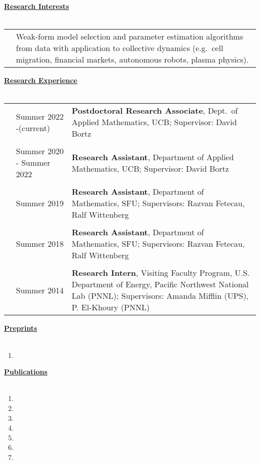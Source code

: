 \documentclass[letterpaper,11pt,oneside]{article}
\newcommand{\headr}[1]{\vspace{10pt}\uline{\Large{\textbf{#1}} \hfill } \\ \vspace{-10pt}\\}
\begin{document}
\headr{Research Interests}
%
\begin{tabular}{@{} p{0.5cm} p{15cm}}
 & Weak-form model selection and parameter estimation algorithms from data with application to collective dynamics (e.g.\ cell migration, financial markets, autonomous robots, plasma physics).
\end{tabular}

\headr{Research Experience}

\begin{tabular}{@{} p{0.01cm} p{2.5cm} p{12cm}}
& Summer 2022 -\newline (current)  & 
\textbf{Postdoctoral Research Associate}, Dept.\ of Applied Mathematics, UCB;
Supervisor: David Bortz \\
& & \\
& Summer 2020 - \newline Summer 2022  & 
\textbf{Research Assistant}, Department of Applied Mathematics, UCB; \newline
Supervisor: David Bortz \\
&     & \\
& Summer 2019  & 
\textbf{Research Assistant}, Department of Mathematics, SFU;
\newline Supervisors: Razvan Fetecau, Ralf Wittenberg \\
&     & \\
& Summer 2018  & 
\textbf{Research Assistant}, Department of Mathematics, SFU;
\newline Supervisors: Razvan Fetecau, Ralf Wittenberg \\
&     & \\
& Summer 2014  & 
\textbf{Research Intern},  Visiting Faculty Program, U.S. Department of Energy, Pacific Northwest National Lab (PNNL);
\newline Supervisors: Amanda Mifflin (UPS), P. El-Khoury (PNNL) 
\end{tabular}




\headr{Preprints}
\begin{enumerate}
\item {}
\end{enumerate}

\headr{Publications}

\begin{enumerate}
\item {}
\item {}
\item {}
\item {}
\item {}
\item {}
\item {}
\end{enumerate}
\end{document}

